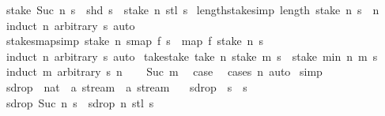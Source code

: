 \begin{isabellebody}
{\isacharbar}\ {\isachardoublequoteopen}stake\ {\isacharparenleft}Suc\ n{\isacharparenright}\ s\ {\isacharequal}\ shd\ s\ {\isacharhash}\ stake\ n\ {\isacharparenleft}stl\ s{\isacharparenright}{\isachardoublequoteclose}\isanewline
\isanewline
{}\isamarkupfalse%
\ length{\isacharunderscore}stake{\isacharbrackleft}simp{\isacharbrackright}{\isacharcolon}\ {\isachardoublequoteopen}length\ {\isacharparenleft}stake\ n\ s{\isacharparenright}\ {\isacharequal}\ n{\isachardoublequoteclose}\isanewline
%
\isadelimproof
\ \ %
\endisadelimproof
%
\isatagproof
{}\isamarkupfalse%
\ {\isacharparenleft}induct\ n\ arbitrary{\isacharcolon}\ s{\isacharparenright}\ auto%
\endisatagproof
{\isafoldproof}%
%
\isadelimproof
\isanewline
%
\endisadelimproof
\isanewline
{}\isamarkupfalse%
\ stake{\isacharunderscore}smap{\isacharbrackleft}simp{\isacharbrackright}{\isacharcolon}\ {\isachardoublequoteopen}stake\ n\ {\isacharparenleft}smap\ f\ s{\isacharparenright}\ {\isacharequal}\ map\ f\ {\isacharparenleft}stake\ n\ s{\isacharparenright}{\isachardoublequoteclose}\isanewline
%
\isadelimproof
\ \ %
\endisadelimproof
%
\isatagproof
{}\isamarkupfalse%
\ {\isacharparenleft}induct\ n\ arbitrary{\isacharcolon}\ s{\isacharparenright}\ auto%
\endisatagproof
{\isafoldproof}%
%
\isadelimproof
\isanewline
%
\endisadelimproof
\isanewline
{}\isamarkupfalse%
\ take{\isacharunderscore}stake{\isacharcolon}\ {\isachardoublequoteopen}take\ n\ {\isacharparenleft}stake\ m\ s{\isacharparenright}\ {\isacharequal}\ stake\ {\isacharparenleft}min\ n\ m{\isacharparenright}\ s{\isachardoublequoteclose}\isanewline
%
\isadelimproof
%
\endisadelimproof
%
\isatagproof
{}\isamarkupfalse%
\ {\isacharparenleft}induct\ m\ arbitrary{\isacharcolon}\ s\ n{\isacharparenright}\isanewline
\ \ \isamarkupfalse%
\ {\isacharparenleft}Suc\ m{\isacharparenright}\ \isamarkupfalse%
\ {\isacharquery}case\ \isamarkupfalse%
\ {\isacharparenleft}cases\ n{\isacharparenright}\ auto\isanewline
{}\isamarkupfalse%
\ simp%
\endisatagproof
{\isafoldproof}%
%
\isadelimproof
\isanewline
%
\endisadelimproof
\isanewline
{}\isamarkupfalse%
\ sdrop\ {\isacharcolon}{\isacharcolon}\ {\isachardoublequoteopen}nat\ {\isasymRightarrow}\ {\isacharprime}a\ stream\ {\isasymRightarrow}\ {\isacharprime}a\ stream{\isachardoublequoteclose}\ \isanewline
\ \ {\isachardoublequoteopen}sdrop\ {}\ s\ {\isacharequal}\ s{\isachardoublequoteclose}\isanewline
{\isacharbar}\ {\isachardoublequoteopen}sdrop\ {\isacharparenleft}Suc\ n{\isacharparenright}\ s\ {\isacharequal}\ sdrop\ n\ {\isacharparenleft}stl\ s{\isacharparenright}{\isachardoublequoteclose}\isanewline

\end{isabellebody}
